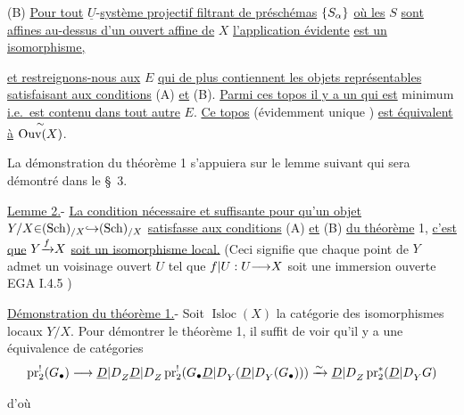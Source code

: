 (B) \uline{Pour tout} $\underline{U}$-\uline{système projectif filtrant de préschémas} ${\{}S_{{\alpha}}{\}}$ \uline{où les} $S$ \uline{sont affines au-dessus d'un ouvert affine de} $X$ \uline{l'application évidente}
\uline{est un isomorphisme,}

\uline{et restreignons-nous aux} $E$ \uline{qui de plus contiennent les objets représentables satisfaisant aux conditions} (A) \uline{et} (B). \uline{Parmi ces topos il y a un qui est} minimum \uline{i.e.\ est contenu dans tout autre} $E$. \uline{Ce topos} (évidemment unique ) \uline{est équivalent à} $\overset{{\sim}}{\operatorname{Ouv}(X)}$.

La démonstration du théorème 1 s'appuiera sur le lemme suivant qui sera démontré dans le \S\ 3.

\uline{Lemme 2.}- \uline{La condition nécessaire et suffisante pour qu'un objet} $Y/X{\in}(\mathrm{Sch})_{/X}{\hookrightarrow}(\mathrm{Sch})_{/X}$ \uline{satisfasse aux conditions} (A) \uline{et} (B) \uline{du théorème} 1, \uline{c'est que} $Y{\xrightarrow{f}}X$ \uline{soit un isomorphisme local.}
(Ceci signifie que chaque point de $Y$ admet un voisinage ouvert $U$ tel que $f{|}U:U{\longrightarrow}X$ soit une immersion ouverte \inserted{[}EGA I.4.5\inserted{]} )

\uline{Démonstration du théorème 1.}- Soit $\operatorname{Isloc}(X)$ la catégorie des isomorphismes locaux $Y/X$. Pour démontrer le théorème 1, il suffit de voir qu'il y a une équivalence de catégories
\[
\operatorname{pr}_2^!(G_\bullet)\longrightarrow{{{\underline{D}|D}_Z{\underline{D}|D}_Z}}\operatorname{pr}_2^!({G_\bullet}{{\underline{D}|D}_Y({\underline{D}|D}_Y(G_\bullet))})\xrightarrow{\sim}{\underline{D}|D}_Z\operatorname{pr}_2^*({\underline{D}|D}_Y G)
\]

d'où

